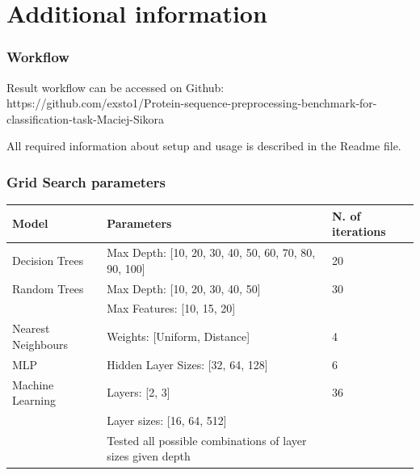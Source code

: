 \documentclass[12pt]{article}
\begin{document}
\section*{Additional information}
\subsubsection*{Workflow}
Result workflow can be accessed on Github: \\ https://github.com/exsto1/Protein-sequence-preprocessing-benchmark-for-classification-task-Maciej-Sikora

All required information about setup and usage is described in the Readme file.

\subsubsection*{Grid Search parameters}
\begin{center}
\begin{tabular}{ | l | l | l |} 
\hline
Model & Parameters & N. of iterations\\ 
\hline
\hline
Decision Trees & Max Depth: [10, 20, 30, 40, 50, 60, 70, 80, 90, 100] & 20\\
\hline
Random Trees & Max Depth: [10, 20, 30, 40, 50] & 30\\ 
 & Max Features: [10, 15, 20] & \\ 
\hline
Nearest Neighbours & Weights: [Uniform, Distance] & 4 \\ 
\hline
MLP & Hidden Layer Sizes: [32, 64, 128] & 6\\ 
\hline
Machine Learning & Layers: [2, 3] & 36\\
 & Layer sizes: [16, 64, 512] & \\
 & Tested all possible combinations of layer sizes given depth & \\
\hline
\end{tabular}
\end{center}
\end{document}

